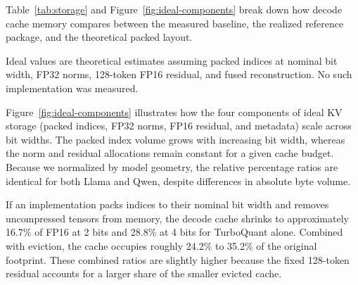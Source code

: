 \documentclass[sigconf,nonacm]{acmart}
\begin{document}
\begin{itemize}
Table~\ref{tab:storage} and Figure~\ref{fig:ideal-components} break down how decode cache memory compares between the measured baseline, the realized reference package, and the theoretical packed layout.

\begin{table}[htbp]
\caption{Decode Storage at 4096 Tokens: Measured vs.\ Ideal (MiB)}
\label{tab:storage}
\centering\small
{}
\begin{minipage}{\columnwidth}\vspace{2pt}\footnotesize
Ideal values are theoretical estimates assuming packed indices at nominal bit
width, FP32 norms, 128-token FP16 residual, and fused reconstruction. No such
implementation was measured.
\end{minipage}
\end{table}

Figure~\ref{fig:ideal-components} illustrates how the four components of ideal KV storage (packed indices, FP32 norms, FP16 residual, and metadata) scale across bit widths. The packed index volume grows with increasing bit width, whereas the norm and residual allocations remain constant for a given cache budget. Because we normalized by model geometry, the relative percentage ratios are identical for both Llama and Qwen, despite differences in absolute byte volume.

If an implementation packs indices to their nominal bit width and removes uncompressed tensors from memory, the decode cache shrinks to approximately 16.7\% of FP16 at 2 bits and 28.8\% at 4 bits for TurboQuant alone. Combined with eviction, the cache occupies roughly 24.2\% to 35.2\% of the original footprint. These combined ratios are slightly higher because the fixed 128-token residual accounts for a larger share of the smaller evicted cache.


\end{itemize}
\end{document}
